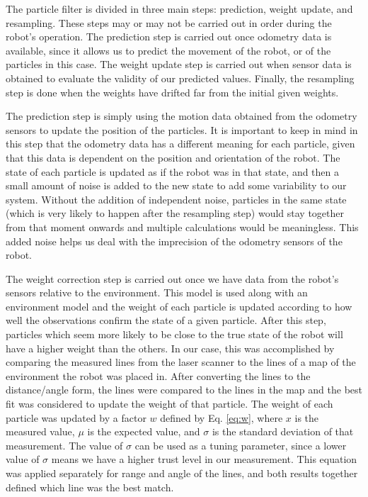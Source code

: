 \documentclass[journal]{IEEEtran}
\begin{document}
The particle filter is divided in three main steps: prediction, weight update, and resampling. These steps may or may not be carried out in order during the robot's operation. The prediction step is carried out once odometry data is available, since it allows us to predict the movement of the robot, or of the particles in this case. The weight update step is carried out when sensor data is obtained to evaluate the validity of our predicted values. Finally, the resampling step is done when the weights have drifted far from the initial given weights.

The prediction step is simply using the motion data obtained from the odometry sensors to update the position of the particles. It is important to keep in mind in this step that the odometry data has a different meaning for each particle, given that this data is dependent on the position and orientation of the robot. The state of each particle is updated as if the robot was in that state, and then a small amount of noise is added to the new state to add some variability to our system. Without the addition of independent noise, particles in the same state (which is very likely to happen after the resampling step) would stay together from that moment onwards and multiple calculations would be meaningless. This added noise helps us deal with the imprecision of the odometry sensors of the robot.

The weight correction step is carried out once we have data from the robot's sensors relative to the environment. This model is used along with an environment model and the weight of each particle is updated according to how well the observations confirm the state of a given particle. After this step, particles which seem more likely to be close to the true state of the robot will have a higher weight than the others. In our case, this was accomplished by comparing the measured lines from the laser scanner to the lines of a map of the environment the robot was placed in. After converting the lines to the distance/angle form, the lines were compared to the lines in the map and the best fit was considered to update the weight of that particle. The weight of each particle was updated by a factor $w$ defined by Eq. \ref{eq:w}, where $x$ is the measured value, $\mu$ is the expected value, and $\sigma$ is the standard deviation of that measurement. The value of $\sigma$ can be used as a tuning parameter, since a lower value of $\sigma$ means we have a higher trust level in our measurement. This equation was applied separately for range and angle of the lines, and both results together defined which line was the best match.
\end{document}
